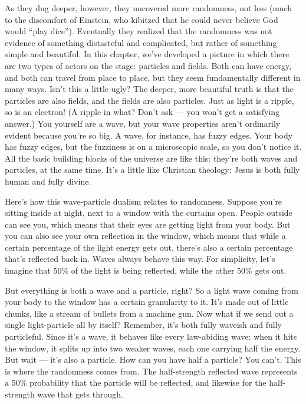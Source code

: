 As they dug deeper,
however, they uncovered more randomness, not less (much to the discomfort of Einstein,
who kibitzed that he could never believe God would ``play dice'').
Eventually they realized that the randomness was not evidence of something distasteful
and complicated, but rather of something simple and beautiful. In this chapter, we've
developed a picture in which there are two types of actors on the stage:
particles and fields. Both can have energy, and both can travel from place to place,
but they seem fundamentally different in many ways. Isn't this a little ugly?
The deeper, more beautiful truth is that the particles are also fields, and the fields
are also particles. Just as light is a ripple, so is an electron! (A ripple in what? Don't
ask --- you won't get a satisfying answer.) You yourself are a wave, but your wave properties
aren't ordinarily evident because you're so big. A wave, for instance, has fuzzy edges.
Your body has fuzzy edges, but the fuzziness is on a microscopic scale, so you don't notice
it. All the basic building blocks of the universe are like this: they're both waves and
particles, at the same time. It's a little like Christian theology: Jesus is both fully
human and fully divine.

Here's how this wave-particle dualism relates to randomness. Suppose you're sitting inside
at night, next to a window with the curtains open. People outside can see you, which means
that their eyes are getting light from your body. But you can also see your own reflection
in the window, which means that while a certain percentage of the light energy gets out,
there's also a certain percentage that's reflected back in. Waves always behave this way.
For simplicity, let's imagine that 50\% of the light is being reflected, while the other
50\% gets out.

But everything is both a wave and a particle, right? So a light wave coming from your
body to the window has a certain granularity to it. It's made out of little chunks, like
a stream of bullets from a machine gun. Now what if we send out a single light-particle
all by itself? Remember, it's both fully waveish and fully particleful. Since it's a
wave, it behaves like every law-abiding wave: when it hits the window, it splits up
into two weaker waves, each one carrying half the energy. But wait --- it's also
a particle. How can you have half a particle? You can't. This is where the randomness
comes from. The half-strength reflected wave represents a 50\% probability that the
particle will be reflected, and likewise for the half-strength wave that gets through.

